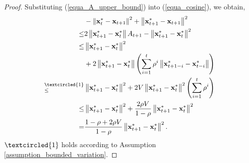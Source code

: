 \documentclass[journal]{IEEEtran}
\begin{document}
\begin{proof}
Substituting  (\ref{equa_A_upper_bound}) into (\ref{equa_cosine}), we obtain,
\begin{align}
\nonumber
&-  \lrnorm{\x_t^{\ast} - \x_{t+1}}^2   + \lrnorm { \x_{t+1}^{\ast} - \x_{t+1} }^2 \\ \nonumber 
\le &  2 \lrnorm {\x_{t+1}^{\ast} - \x_t^{\ast}} A_{t+1} - \lrnorm{\x_{t+1}^{\ast} - \x_t^{\ast}}^2  \\ \nonumber
\le & \lrnorm {\x_{t+1}^{\ast} - \x_t^{\ast}}^2 \\  \nonumber 
&+ 2\lrnorm {\x_{t+1}^{\ast} - \x_t^{\ast}} \lrincir{\sum\limits_{i=1}^{t}\rho^i \lrnorm{\x_{t+1-i}^{\ast} - \x_{t-i}^{\ast}}} \\ \nonumber
\refabovecir{\le}{\textcircled{1}} & \lrnorm {\x_{t+1}^{\ast} - \x_t^{\ast}}^2 + 2V\lrnorm {\x_{t+1}^{\ast} - \x_t^{\ast}}^2 \lrincir{\sum\limits_{i=1}^{t}\rho^i } \\ \nonumber
\le & \lrnorm {\x_{t+1}^{\ast} - \x_t^{\ast}}^2 + \frac{2\rho V}{1-\rho}\lrnorm {\x_{t+1}^{\ast} - \x_t^{\ast}}^2 \\ \label{equa_recursive_upper_bound}
= & \frac{1-\rho + 2\rho V}{1-\rho}\lrnorm {\x_{t+1}^{\ast} - \x_t^{\ast}}^2. 
\end{align}  $\textcircled{1}$ holds according to Assumption \ref{assumption_bounded_variation}.





\end{proof}
\end{document}
